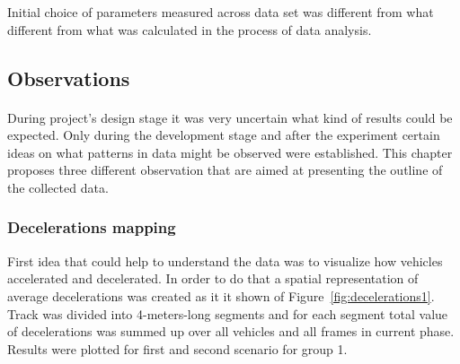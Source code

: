 \documentclass[11pt,english]{article}
\begin{document}
Initial choice of parameters measured across data set was different from what different from what was calculated in the process of data analysis.



\subsection{Observations}


\paragraph{}

During project's design stage it was very uncertain what kind of results could be expected. Only during the development stage and after the experiment certain ideas on what patterns in data might be observed were established. This chapter proposes three different observation that are aimed at presenting the outline of the collected data. 











\subsubsection{Decelerations mapping}

First idea that could help to understand the data was to visualize how vehicles accelerated and decelerated. In order to do that a spatial representation of average decelerations was created as it it shown of Figure~\ref{fig:decelerations1}. Track was divided into 4-meters-long segments and for each segment total value of decelerations was summed up over all vehicles and all frames in current phase. Results were plotted for first and second scenario for group 1.
\end{document}
